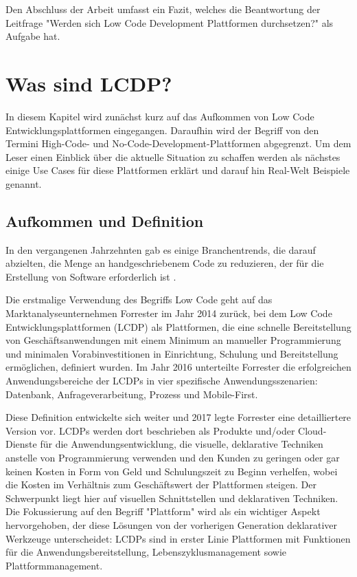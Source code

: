 \documentclass[12pt]{article} %
\begin{document}
	Den Abschluss der Arbeit umfasst ein Fazit, welches die Beantwortung der Leitfrage "Werden sich Low Code Development Plattformen durchsetzen?" als Aufgabe hat. 
	
	\section{Was sind LCDP?}
	In diesem Kapitel wird zunächst kurz auf das Aufkommen von Low Code Entwicklungsplattformen eingegangen. Daraufhin wird der Begriff von den Termini High-Code- und No-Code-Development-Plattformen abgegrenzt. Um dem Leser einen Einblick über die aktuelle Situation zu schaffen werden als nächstes einige Use Cases für diese Plattformen erklärt und darauf hin Real-Welt Beispiele genannt. 
	
	\subsection{Aufkommen und Definition}		
	In den vergangenen Jahrzehnten gab es einige Branchentrends, die darauf abzielten, die Menge an handgeschriebenem Code zu reduzieren, der für die Erstellung von Software erforderlich ist \autocite{DiRuscio.2022}. \newline
	
	Die erstmalige Verwendung des Begriffs Low Code geht auf das Marktanalyseunternehmen Forrester im Jahr 2014 zurück, bei dem Low Code Entwicklungsplattformen (LCDP) als Plattformen, die eine schnelle Bereitstellung von Geschäftsanwendungen mit einem Minimum an manueller Programmierung und minimalen Vorabinvestitionen in Einrichtung, Schulung und Bereitstellung ermöglichen, definiert wurden. 
	Im Jahr 2016 unterteilte Forrester die erfolgreichen Anwendungsbereiche der LCDPs in vier spezifische Anwendungsszenarien: Datenbank, Anfrageverarbeitung, Prozess und Mobile-First. \autocite{DiRuscio.2022} \newline 
	
	Diese Definition entwickelte sich weiter und 2017 legte Forrester eine detailliertere Version vor. LCDPs werden dort beschrieben als Produkte und/oder Cloud-Dienste für die Anwendungsentwicklung, die visuelle, deklarative Techniken anstelle von Programmierung verwenden und den Kunden zu geringen oder gar keinen Kosten in Form von Geld und Schulungszeit zu Beginn verhelfen, wobei die Kosten im Verhältnis zum Geschäftswert der Plattformen steigen. 
	Der Schwerpunkt liegt hier auf visuellen Schnittstellen und deklarativen Techniken. Die Fokussierung auf den Begriff "Plattform" wird als ein wichtiger Aspekt hervorgehoben, der diese Lösungen von der vorherigen Generation deklarativer Werkzeuge unterscheidet: LCDPs sind in erster Linie Plattformen mit Funktionen für die Anwendungsbereitstellung, Lebenszyklusmanagement sowie Plattformmanagement. \autocite{DiRuscio.2022} \newline
	
\end{document}
